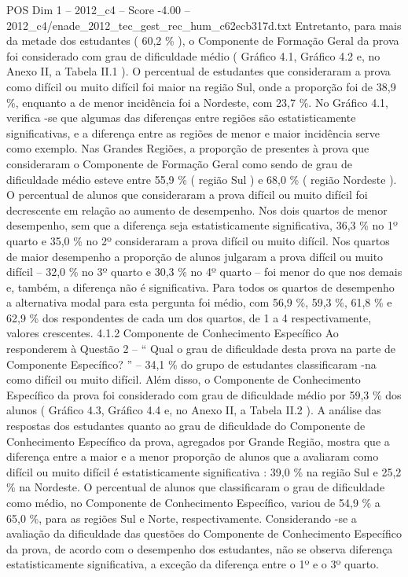 \begin{textsample}{POS Dim 1 – 2012\_c4 – Score -4.00 – 2012\_c4/enade\_2012\_tec\_gest\_rec\_hum\_c62ecb317d.txt}
Entretanto, para mais da metade dos estudantes ( 60,2 \% ), o Componente de Formação Geral da prova foi considerado com grau de dificuldade médio ( Gráfico 4.1, Gráfico 4.2 e, no Anexo II, a Tabela II.1 ).
O percentual de estudantes que consideraram a prova como difícil ou muito difícil foi maior na região Sul, onde a proporção foi de 38,9 \%, enquanto a de menor incidência foi a Nordeste, com 23,7 \%.
No Gráfico 4.1, verifica -se que algumas das diferenças entre regiões são estatisticamente significativas, e a diferença entre as regiões de menor e maior incidência serve como exemplo.
Nas Grandes Regiões, a proporção de presentes à prova que consideraram o Componente de Formação Geral como sendo de grau de dificuldade médio esteve entre 55,9 \% ( região Sul ) e 68,0 \% ( região Nordeste ).
O percentual de alunos que consideraram a prova difícil ou muito difícil foi decrescente em relação ao aumento de desempenho.
Nos dois quartos de menor desempenho, sem que a diferença seja estatisticamente significativa, 36,3 \% no 1º quarto e 35,0 \% no 2º consideraram a prova difícil ou muito difícil.
Nos quartos de maior desempenho a proporção de alunos julgaram a prova difícil ou muito difícil – 32,0 \% no 3º quarto e 30,3 \% no 4º quarto – foi menor do que nos demais e, também, a diferença não é significativa.
Para todos os quartos de desempenho a alternativa modal para esta pergunta foi médio, com 56,9 \%, 59,3 \%, 61,8 \% e 62,9 \% dos respondentes de cada um dos quartos, de 1 a 4 respectivamente, valores crescentes. 4.1.2 Componente de Conhecimento Específico Ao responderem à Questão 2 – “ Qual o grau de dificuldade desta prova na parte de Componente Específico? ” – 34,1 \% do grupo de estudantes classificaram -na como difícil ou muito difícil.
Além disso, o Componente de Conhecimento Específico da prova foi considerado com grau de dificuldade médio por 59,3 \% dos alunos ( Gráfico 4.3, Gráfico 4.4 e, no Anexo II, a Tabela II.2 ).
A análise das respostas dos estudantes quanto ao grau de dificuldade do Componente de Conhecimento Específico da prova, agregados por Grande Região, mostra que a diferença entre a maior e a menor proporção de alunos que a avaliaram como difícil ou muito difícil é estatisticamente significativa : 39,0 \% na região Sul e 25,2 \% na Nordeste.
O percentual de alunos que classificaram o grau de dificuldade como médio, no Componente de Conhecimento Específico, variou de 54,9 \% a 65,0 \%, para as regiões Sul e Norte, respectivamente.
Considerando -se a avaliação da dificuldade das questões do Componente de Conhecimento Específico da prova, de acordo com o desempenho dos estudantes, não se observa diferença estatisticamente significativa, a exceção da diferença entre o 1º e o 3º quarto.

\end{textsample}
